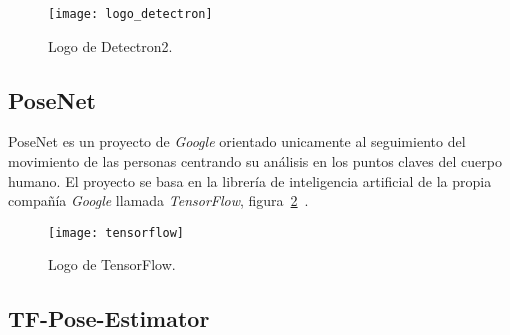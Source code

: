 \begin{figure}[h]
	\centering
	\texttt{[image: logo\_detectron]}
	\caption{Logo de Detectron2.}
	\label{fig:detectron}
\end{figure}

\subsection{PoseNet}
PoseNet es un proyecto de \textit{Google} orientado unicamente al seguimiento del movimiento de las personas centrando su análisis en los puntos claves del cuerpo humano. El proyecto se basa en la librería de inteligencia artificial de la propia compañía \textit{Google} llamada \textit{TensorFlow}, figura~\ref{fig:tensorflow}~\cite{tensorflow2015-whitepaper,tensorflow2020}.

\begin{figure}[h]
	\centering
	\texttt{[image: tensorflow]}
	\caption{Logo de TensorFlow.}
	\label{fig:tensorflow}
\end{figure}

\subsection{TF-Pose-Estimator}

